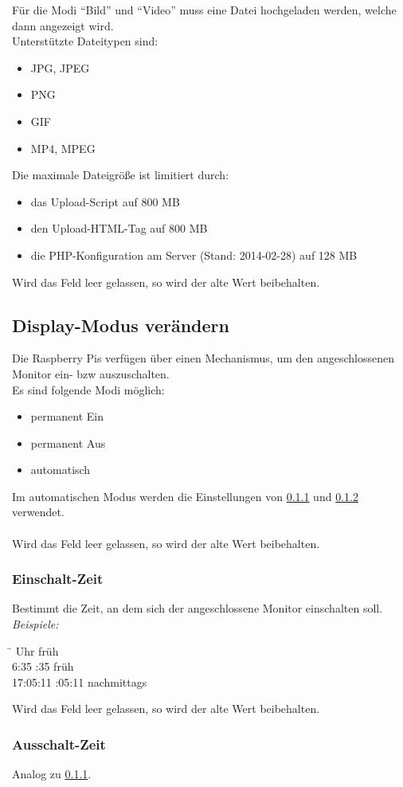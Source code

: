 Für die Modi \enquote{Bild} und \enquote{Video} muss eine Datei hochgeladen werden, welche dann angezeigt wird.\\ 
Unterstützte Dateitypen sind:
\begin{itemize}
	\item JPG, JPEG
	\item PNG
	\item GIF
	\item MP4, MPEG
\end{itemize}
Die maximale Dateigröße ist limitiert durch:
\begin{itemize}
	\item das Upload-Script auf 800 MB
	\item den Upload-HTML-Tag auf 800 MB
	\item die PHP-Konfiguration am Server (Stand: 2014-02-28) auf 128 MB
\end{itemize}
Wird das Feld leer gelassen, so wird der alte Wert beibehalten.\\

\subsection{Display-Modus verändern}

Die Raspberry Pis verfügen über einen Mechanismus, um den angeschlossenen Monitor ein- bzw auszuschalten.\\
Es sind folgende Modi möglich:
\begin{itemize}
	\item permanent Ein
	\item permanent Aus
	\item automatisch
\end{itemize}
Im automatischen Modus werden die Einstellungen von \ref{instr_admin_moni_time_on} und \ref{instr_admin_moni_time_off} verwendet.\\
\\
Wird das Feld leer gelassen, so wird der alte Wert beibehalten.\\

\subsubsection{Einschalt-Zeit}
\label{instr_admin_moni_time_on}

Bestimmt die Zeit, an dem sich der angeschlossene Monitor einschalten soll.\\
\textit{Beispiele:}
\begin{tabbing}
\hspace{2cm}\=  Uhr früh\\ 
6:35 :35 früh\\
17:05:11 :05:11 nachmittags
\end{tabbing}
Wird das Feld leer gelassen, so wird der alte Wert beibehalten.\\

\subsubsection{Ausschalt-Zeit}
\label{instr_admin_moni_time_off}

Analog zu \ref{instr_admin_moni_time_on}.
